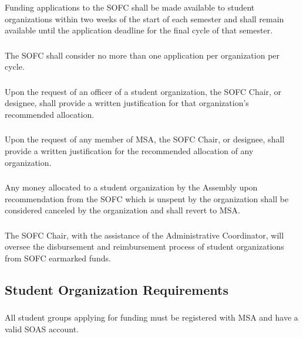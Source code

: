 \subsubsection{}
Funding applications to the SOFC shall be made available to student organizations within two weeks of the start of each semester and shall remain available until the application deadline for the final cycle of that semester.
\subsubsection{}
The SOFC shall consider no more than one application per organization per cycle.
\subsubsection{}
Upon the request of an officer of a student organization, the SOFC Chair, or designee, shall provide a written justification for that organization's recommended allocation.
\subsubsection{}
Upon the request of any member of MSA, the SOFC Chair, or designee, shall provide a written justification for the recommended allocation of any organization.
\subsubsection{}
Any money allocated to a student organization by the Assembly upon recommendation from the SOFC which is unspent by the organization shall be considered canceled by the organization and shall revert to MSA.
\subsubsection{}
The SOFC Chair, with the assistance of the Administrative Coordinator, will oversee the disbursement and reimbursement process of student organizations from SOFC earmarked funds.

\subsection{Student Organization Requirements}
\subsubsection{}
All student groups applying for funding must be registered with MSA and have a valid SOAS account.
